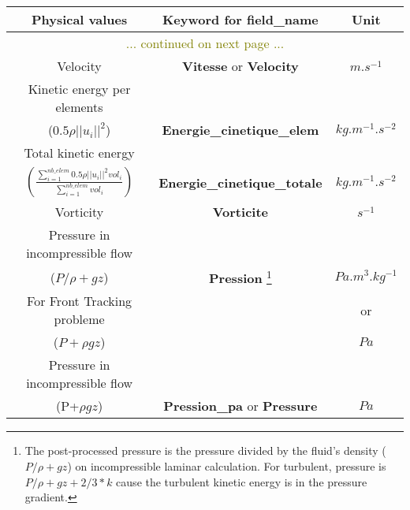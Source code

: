 \begin{longtable}[hcr]{|c|c|c|}
\hline \textbf{Physical values}                        & \textbf{Keyword for field\_name}          & \textbf{Unit} \\ \hline \endhead
\hline\multicolumn{3}{|c|}{\textcolor{olive}{... continued on next page ...}}  \\ \hline \endfoot
\hline \hline \endlastfoot


Velocity                                        & \textbf{Vitesse} or \textbf{Velocity}     & $m.s^{-1}$ \\ \hline
Kinetic energy per elements                     &                                           & \\
($0.5 \rho ||u_i||^2$)                          & \textbf{Energie\_cinetique\_elem}         & $kg.m^{-1}.s^{-2}$ \\ \hline
Total kinetic energy                            &                                           & \\
$\displaystyle \left( \frac{\sum_{i=1}^{nb\_elem} 0.5 \rho ||u_i||^2 vol_i}{\sum_{i=1}^{nb\_elem} vol_i} \right)$                            & \textbf{Energie\_cinetique\_totale}       & $kg.m^{-1}.s^{-2}$ \\ \hline
Vorticity                                       & \textbf{Vorticite}                        & $s^{-1}$ \\ \hline
Pressure in incompressible flow                 &                                           & \\
($P/\rho+gz$)                                   & \textbf{Pression} \footnote{The post-processed pressure is the pressure divided by the fluid's density ($P/\rho+gz$) on incompressible laminar calculation. For turbulent, pressure is $P/\rho+gz+2/3*k$ cause the turbulent kinetic energy is in the pressure gradient.}
                                                                                            & $Pa.m^3.kg^{-1}$ \\
For Front Tracking probleme                     &                                           & or \\
($P+\rho gz$)                                   &                                           &  $Pa$ \\ \hline
Pressure in incompressible flow                 &                                           &   \\
(P+$\rho gz$)                                   & \textbf{Pression\_pa} or \textbf{Pressure}         & $Pa$ \\ \hline

\end{longtable}

